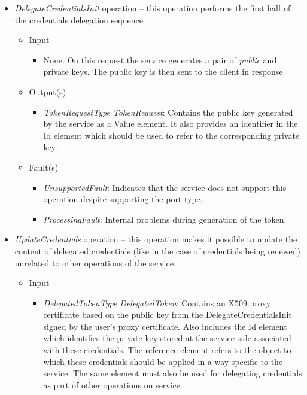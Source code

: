 \documentclass{article}                            %
\begin{document}
\begin{itemize}
\item \emph{DelegateCredentialsInit} operation -- this operation performs
the first half of the credentials delegation sequence.
\begin{itemize}
\item Input
\begin{itemize}
\item None. On this request the service generates a pair of \emph{public}
and private keys. The public key is then sent to the client in response.
\end{itemize}
\item Output(s)
\begin{itemize}
\item \emph{TokenRequestType TokenRequest}: Contains the public key generated
by the service as a Value element. It also provides an identifier
in the Id element which should be used to refer to the corresponding
private key.
\end{itemize}
\item Fault(s)
\begin{itemize}
\item \emph{UnsupportedFault}: Indicates that the service does not support
this operation despite supporting the port-type.
\item \emph{ProcessingFault}: Internal problems during generation of the
token.
\end{itemize}
\end{itemize}
\item \emph{UpdateCredentials} operation -- this operation makes it possible
to update the content of delegated credentials (like in the case of
credentials being renewed) unrelated to other operations of the service.
\begin{itemize}
\item Input
\begin{itemize}
\item \emph{DelegatedTokenType DelegatedToken}: Contains an X509 proxy certificate
based on the public key from the DelegateCredentialsInit signed by
the user's proxy certificate. Also includes the Id element which identifies
the private key stored at the service side associated with these credentials.
The reference element refers to the object to which these credentials
should be applied in a way specific to the service. The same element
must also be used for delegating credentials as part of other operations
on service.
\end{itemize}

\end{itemize}
\end{itemize}
\end{document}
